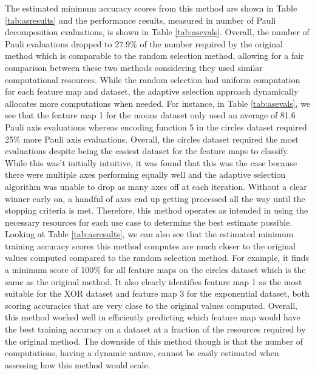\documentclass[
	a4paper, %
	10pt, %
	unnumberedsections, %
	twoside, %
]{LTJournalArticle}
\begin{document}
The estimated minimum accuracy scores from this method are shown in Table \ref{tab:asresults} and the performance results, measured in number of Pauli decomposition evaluations, is shown in 
Table \ref{tab:asevals}. Overall, the number of Pauli evaluations dropped to 27.9\% of the number required by the original method which is comparable to the random selection method, allowing for
a fair comparison between these two methods considering they used similar computational resources. While the random selection had uniform computation for each feature map and dataset, the 
adaptive selection approach dynamically allocates more computations when needed. For instance, in Table \ref{tab:asevals}, we see that the feature map 1 for the moons dataset only used an 
average of 81.6 Pauli axis evaluations whereas encoding function 5 in the circles dataset required 25\% more Pauli axis evaluations. Overall, the circles dataset required the most evaluations 
despite being the easiest dataset for the feature maps to classify. While this was't initially intuitive, it was found that this was the case because there were multiple axes performing equally 
well and the adaptive selection algorithm was unable to drop as many axes off at each iteration. Without a clear winner early on, a handful of axes end up getting processed all the way until 
the stopping criteria is met. Therefore, this method operates as intended in using the necessary resources for each use case to determine the best estimate possible. Looking at Table 
\ref{tab:asresults}, we can also see that the estimated minimum training accuracy scores this method computes are much closer to the original values computed compared to the random selection 
method. For example, it finds a minimum score of 100\% for all feature maps on the circles dataset which is the same as the original method. It also clearly identifies feature map 1 as the most 
suitable for the XOR dataset and feature map 3 for the exponential dataset, both scoring accuracies that are very close to the original values computed. Overall, this method worked well in 
efficiently predicting which feature map would have the best training accuracy on a dataset at a fraction of the resources required by the original method. The downside of this method though 
is that the number of computations, having a dynamic nature, cannot be easily estimated when assessing how this method would scale.
\end{document}
